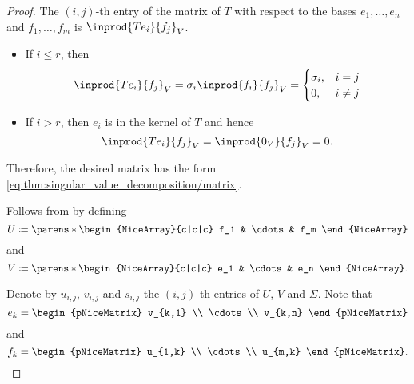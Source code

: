 \begin{proof}
  The \( (i, j) \)-th entry of the matrix of \( T \) with respect to the bases \( e_1, \ldots, e_n \) and \( f_1, \ldots, f_m \) is \( \inprod { T e_i } { f_j }_V \).
  \begin{itemize}
    \item If \( i \leq r \), then
    \begin{equation*}
      \inprod { T e_i } { f_j }_V
      =
      \sigma_i \inprod { f_i } { f_j }_V
      =
      \begin{cases}
        \sigma_i, &i = j \\
        0,        &i \neq j \\
      \end{cases}
    \end{equation*}

    \item If \( i > r \), then \( e_i \) is in the kernel of \( T \) and hence
    \begin{equation*}
      \inprod { T e_i } { f_j }_V
      =
      \inprod { 0_V } { f_j }_V
      =
      0.
    \end{equation*}
  \end{itemize}

  Therefore, the desired matrix has the form \eqref{eq:thm:singular_value_decomposition/matrix}.

   Follows from  by defining
  \begin{equation*}
    U \coloneqq \parens*
    {
      \begin{NiceArray}{c|c|c}
        f_1 & \cdots & f_m
      \end{NiceArray}
    }
  \end{equation*}
  and
  \begin{equation*}
    V \coloneqq \parens*
    {
      \begin{NiceArray}{c|c|c}
        e_1 & \cdots & e_n
      \end{NiceArray}
    }.
  \end{equation*}

  Denote by \( u_{i,j} \), \( v_{i,j} \) and \( s_{i,j} \) the \( (i, j) \)-th entries of \( U \), \( V \) and \( \Sigma \). Note that
  \begin{equation*}
    e_k = \begin{pNiceMatrix} v_{k,1} \\ \cdots \\ v_{k,n} \end{pNiceMatrix}
  \end{equation*}
  and
  \begin{equation*}
    f_k = \begin{pNiceMatrix} u_{1,k} \\ \cdots \\ u_{m,k} \end{pNiceMatrix}.
  \end{equation*}


\end{proof}
